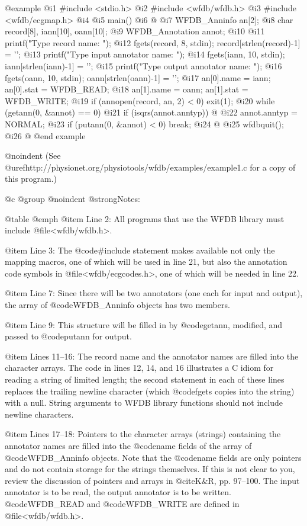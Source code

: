 {{{{{{{{{{{{{{@example
 @i{1}  #include <stdio.h>
 @i{2}  #include <wfdb/wfdb.h>
 @i{3}  #include <wfdb/ecgmap.h>
 @i{4}
 @i{5}  main()
 @i{6}  @{
 @i{7}      WFDB_Anninfo an[2];
 @i{8}      char record[8], iann[10], oann[10];
 @i{9}      WFDB_Annotation annot;
@i{10}
@i{11}      printf("Type record name: ");
@i{12}      fgets(record, 8, stdin); record[strlen(record)-1] = '\0';
@i{13}      printf("Type input annotator name: ");
@i{14}      fgets(iann, 10, stdin); iann[strlen(iann)-1] = '\0';
@i{15}      printf("Type output annotator name: ");
@i{16}      fgets(oann, 10, stdin); oann[strlen(oann)-1] = '\0';
@i{17}      an[0].name = iann; an[0].stat = WFDB_READ;
@i{18}      an[1].name = oann; an[1].stat = WFDB_WRITE;
@i{19}      if (annopen(record, an, 2) < 0) exit(1);
@i{20}      while (getann(0, &annot) == 0)
@i{21}          if (isqrs(annot.anntyp)) @{
@i{22}              annot.anntyp = NORMAL;
@i{23}              if (putann(0, &annot) < 0) break;
@i{24}          @}
@i{25}      wfdbquit();
@i{26}  @}
@end example

@noindent
(See @uref{http://physionet.org/physiotools/wfdb/examples/example1.c}
for a copy of this program.)

@c @group
@noindent
@strong{Notes:}

@table @emph
@item Line 2:
All programs that use the WFDB library must include
@file{<wfdb/wfdb.h>}.

@item Line 3:
The @code{#include} statement makes available not only the mapping
macros, one of which will be used in line 21, but also the
annotation code symbols in @file{<wfdb/ecgcodes.h>}, one of which
will be needed in line 22.

@item Line 7:
Since there will be two annotators (one each for input and output),
the array of @code{WFDB_Anninfo} objects has two members.

@item Line 9:
This structure will be filled in by @code{getann}, modified, and passed
to @code{putann} for output.

@item Lines 11--16:
The record name and the annotator names are filled into the character
arrays.  The code in lines 12, 14, and 16 illustrates a C idiom for
reading a string of limited length; the second statement in each of
these lines replaces the trailing newline character (which @code{fgets}
copies into the string) with a null.  String arguments to WFDB library
functions should not include newline characters.

@item Lines 17--18:
Pointers to the character arrays (strings) containing the annotator
names are filled into the @code{name} fields of the array of
@code{WFDB_Anninfo} objects. Note that the @code{name} fields are only
pointers and do not contain storage for the strings themselves.  If this
is not clear to you, review the discussion of pointers and arrays in
@cite{K&R}, pp.  97--100.  The input annotator is to be read, the output
annotator is to be written.  @code{WFDB_READ} and @code{WFDB_WRITE} are
defined in @file{<wfdb/wfdb.h>}.

}}}}}}}}}}}}}}

